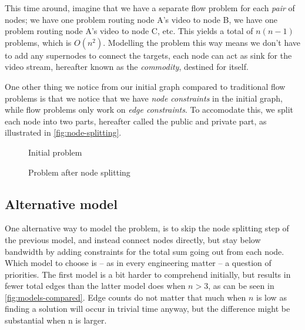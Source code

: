 This time around, imagine that we have a separate flow problem for each \emph{pair} of nodes; we have one problem routing node A's video to node B, we have one problem routing node A's video to node C, etc. This yields a total of $n(n-1)$ problems, which is $O(n^2)$. Modelling the problem this way means we don't have to add any supernodes to connect the targets, each node can act as sink for the video stream, hereafter known as the \emph{commodity}, destined for itself.

One other thing we notice from our initial graph compared to traditional flow problems is that we notice that we have \emph{node constraints} in the initial graph, while flow problems only work on \emph{edge constraints}. To accomodate this, we split each node into two parts, hereafter called the public and private part, as illustrated in \autoref{fig:node-splitting}.

\begin{figure}[ht!]
\centering
    \caption{Initial problem}
\end{figure}

\begin{figure}[ht!]
\centering
    \caption{Problem after node splitting}
\end{figure}


\subsection{Alternative model}

One alternative way to model the problem, is to skip the node splitting step of the previous model, and instead connect nodes directly, but stay below bandwidth by adding constraints for the total sum going out from each node. Which model to choose is -- as in every engineering matter -- a question of priorities. The first model is a bit harder to comprehend initially, but results in fewer total edges than the latter model does when $n>3$, as can be seen in \autoref{fig:models-compared}. Edge counts do not matter that much when $n$ is low as finding a solution will occur in trivial time anyway, but the difference might be substantial when n is larger. 

